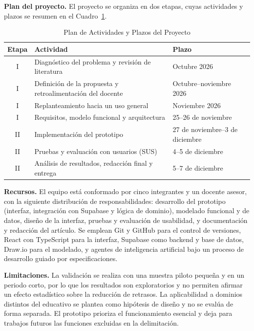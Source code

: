 \documentclass[conference]{IEEEtran}
\begin{document}
\textbf{Plan del proyecto.} El proyecto se organiza en dos etapas, cuyas actividades y plazos se resumen en el Cuadro~\ref{tab:plan_proyecto}.

\begin{table}[htbp]
\caption{Plan de Actividades y Plazos del Proyecto}
\label{tab:plan_proyecto}
\centering
\begin{tabular}{cp{4.4cm}p{2.3cm}}
\toprule
\textbf{Etapa} & \textbf{Actividad} & \textbf{Plazo} \\
\midrule
I & Diagnóstico del problema y revisión de literatura & Octubre 2026 \\
I & Definición de la propuesta y retroalimentación del docente & Octubre--noviembre 2026 \\
I & Replanteamiento hacia un uso general & Noviembre 2026 \\
I & Requisitos, modelo funcional y arquitectura & 25--26 de noviembre \\
II & Implementación del prototipo & 27 de noviembre--3 de diciembre \\
II & Pruebas y evaluación con usuarios (SUS) & 4--5 de diciembre \\
II & Análisis de resultados, redacción final y entrega & 5--7 de diciembre \\
\bottomrule
\end{tabular}
\end{table}

\textbf{Recursos.} El equipo está conformado por cinco integrantes y un docente asesor, con la siguiente distribución de responsabilidades: desarrollo del prototipo (interfaz, integración con Supabase y lógica de dominio), modelado funcional y de datos, diseño de la interfaz, pruebas y evaluación de usabilidad, y documentación y redacción del artículo. Se emplean Git y GitHub para el control de versiones, React con TypeScript para la interfaz, Supabase como backend y base de datos, Draw.io para el modelado, y agentes de inteligencia artificial bajo un proceso de desarrollo guiado por especificaciones.

\textbf{Limitaciones.} La validación se realiza con una muestra piloto pequeña y en un periodo corto, por lo que los resultados son exploratorios y no permiten afirmar un efecto estadístico sobre la reducción de retrasos. La aplicabilidad a dominios distintos del educativo se plantea como hipótesis de diseño y no se evalúa de forma separada. El prototipo prioriza el funcionamiento esencial y deja para trabajos futuros las funciones excluidas en la delimitación.
\end{document}
